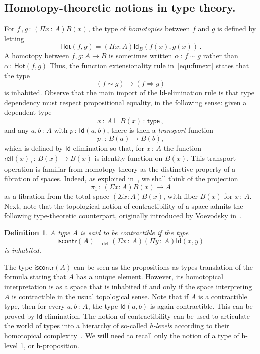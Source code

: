 \documentclass[10pt,a4paper,oneside,reqno]{amsart}
\theoremstyle{mythm}
\theoremstyle{mydef}
\newtheorem{definition}[theorem]{Definition}
\theoremstyle{myrmk}
\newcommand{\deq}{=}
\newcommand{\defeq}{=_{\mathrm{def}}}
\newcommand{\co}{\,{:}\,}
\newcommand{\type}{\mathsf{type}}
\newcommand{\iscontr}{\mathsf{iscontr}}
\newcommand{\Hot}{\mathsf{Hot}}
\newcommand{\Id}{\mathsf{Id}}
\newcommand{\refl}{\mathsf{refl}}
\begin{document}
\subsection*{Homotopy-theoretic notions in type theory.} For $f \, , g \co (\Pi x \co A) B(x)$, the type of
\emph{homotopies} between $f$ and $g$ is defined by letting
\[
\Hot(f,g) \deq (\Pi x:A) \Id_{B}(f(x),g(x)) \, .
\]
A homotopy between $f, g :A\to B$ is sometimes written $\alpha \co f \sim g$ rather than $\alpha \co \Hot(f,g)$
Thus, the function extensionality rule in~\eqref{equ:funext} states that the type 
\[
(f \sim g) \rightarrow (f \Rightarrow g)
\] 
is inhabited. Observe that the main import of the 
$\Id$-elimination rule is that  type dependency must respect propositional equality, in the following sense: given a dependent type
\begin{equation*}
x\co A \vdash B(x) \co \type \, ,
\end{equation*} 
and any $a,b\co A$ with $p\co \Id(a,b)$, there is then a \emph{transport} function 
 $$p_{\, ! } \co B(a) \rightarrow B(b),$$ which is defined by $\Id$-elimination so that, for $x \co A$
the function $\refl(x)_{\, !} \co B(x) \rightarrow B(x)$ is identity function on $B(x)$.  This transport operation is familiar from homotopy theory as the distinctive property of a fibration of spaces.  Indeed, as exploited
in~\cite{AwodeyS:homtmi}, we shall think of the projection 
\[
\pi_1 \co (\Sigma x:A) B(x) \to A
\] 
as a fibration from the total space $(\Sigma x:A)B(x)$, with fiber $B(x)$ for $x\co A$.
Next, note that the topological notion of contractibility of a space admits the following type-theoretic counterpart, originally
 introduced by Voevodsky in~\cite{VoevodskyV:unifc}.

\begin{definition}  A type $A$ is said to be \emph{contractible} if the  type 
 \begin{equation}
 \label{eq:contractible}
\iscontr(A) \defeq (\Sigma x\co A) (\Pi y\co A) \Id(x,y)
\end{equation}
is inhabited.
\end{definition} 

The type $\iscontr(A)$ can be seen as the propositions-as-types translation
of the formula stating that $A$ has a unique element. However, its homotopical interpretation 
is as a space that is inhabited if and only if the space interpreting $A$ is contractible in the usual
topological sense. Note that if $A$ is a contractible type, then for every $a, b \co A$, the type $\Id(a,b)$ is again contractible. 
This can be proved  by $\Id$-elimination. 
The notion of contractibility can be used to articulate the world of types  into a hierarchy of so-called \emph{h-levels} according to their
homotopical complexity~\cite{VoevodskyV:unifc}. We will need to recall only the notion of a type of h-level 1, or h-proposition.
\end{document}
